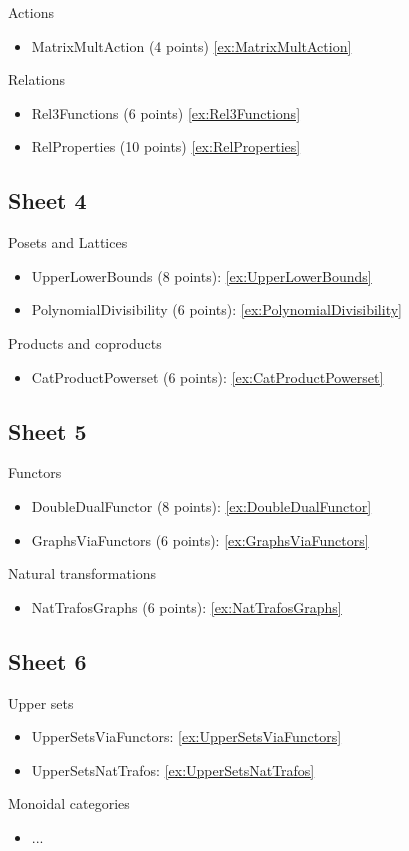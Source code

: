 Actions
\begin{itemize}
\item MatrixMultAction (4 points) \cref{ex:MatrixMultAction}
\end{itemize}


Relations
\begin{itemize}
\item Rel3Functions (6 points) \cref{ex:Rel3Functions}
\item RelProperties (10 points) \cref{ex:RelProperties}
\end{itemize}



\subsection{Sheet 4}

Posets and Lattices
\begin{itemize}
\item UpperLowerBounds (8 points): \cref{ex:UpperLowerBounds}
\item PolynomialDivisibility (6 points):  \cref{ex:PolynomialDivisibility}
\end{itemize}


Products and coproducts
\begin{itemize}
\item CatProductPowerset (6 points): \cref{ex:CatProductPowerset}
\end{itemize}


\subsection{Sheet 5}

Functors
\begin{itemize}
\item DoubleDualFunctor (8 points): \cref{ex:DoubleDualFunctor}
\item GraphsViaFunctors (6 points): \cref{ex:GraphsViaFunctors}
\end{itemize}

Natural transformations
\begin{itemize}
\item NatTrafosGraphs (6 points): \cref{ex:NatTrafosGraphs}

\end{itemize}

\subsection{Sheet 6}

Upper sets
\begin{itemize}
\item UpperSetsViaFunctors: \cref{ex:UpperSetsViaFunctors}
\item UpperSetsNatTrafos: \cref{ex:UpperSetsNatTrafos}
\end{itemize}

Monoidal categories
\begin{itemize}
\item ...
\end{itemize}

